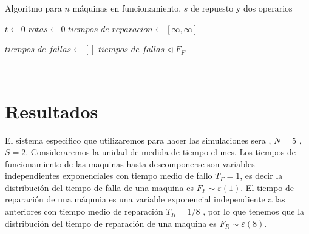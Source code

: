 \documentclass[12pt]{article}
\begin{document}
  \begin{algorithm}
\caption{ Algoritmo para $n$ máquinas en funcionamiento, $s$ de repuesto y dos operarios}
\begin{algorithmic}


\State $t \gets 0$
\State $rotas \gets 0$
\State $tiempos\_de\_reparacion \gets  [\infty,\infty]$

\State $tiempos\_de\_fallas \gets [  ]$
  \State $ tiempos\_de\_fallas \lhd F_F  $

\EndFor
{}
\\
	 	 \EndIf
	 	 \EndIf
	 	 		
	 	 \EndIf
	\Else
		\EndIf
	       \EndIf 
	       	
	\EndIf
\EndWhile

\EndProcedure
\end{algorithmic}
\end{algorithm}

\pagebreak

\newpage

\section{Resultados}
El sistema especifico que utilizaremos para hacer las simulaciones sera , $N=5$ , $S=2$. Consideraremos la unidad de medida de tiempo el mes. Los tiempos de funcionamiento de las maquinas hasta descomponerse son variables independientes exponenciales  con tiempo medio de fallo  $T_F= 1$, es decir la distribución del tiempo de falla de una maquina es $F_F \sim \varepsilon(1)$. El tiempo de reparación de una máqunia es una variable exponencial  independiente a las anteriores con tiempo medio de reparación $T_R=1/8$ , por lo que tenemos que la distribución del tiempo de reparación de una maquina es   $F_R \sim \varepsilon(8)$.
\end{document}
